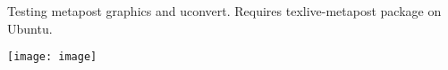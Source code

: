 \documentclass[letterpaper,12pt]{article}
\begin{document}
Testing metapost graphics and uconvert. Requires texlive-metapost package on Ubuntu.

\texttt{[image: image]}
\end{document}
